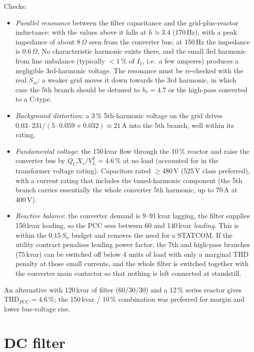 \documentclass[11pt,a4paper]{article}
\begin{document}
Checks:
\begin{itemize}
\item \emph{Parallel resonance} between the filter capacitance and the grid-plus-reactor inductance: with the values above it falls at $h \approx 3.4$ (170\,Hz), with a peak impedance of about 8\,$\Omega$ seen from the converter bus; at 150\,Hz the impedance is 0.6\,$\Omega$. No characteristic harmonic exists there, and the small 3rd harmonic from line unbalance (typically $< 1$\,\% of $I_1$, i.e.\ a few amperes) produces a negligible 3rd-harmonic voltage. The resonance must be re-checked with the real $S_{sc}$: a weaker grid moves it down towards the 3rd harmonic, in which case the 5th branch should be detuned to $h_t = 4.7$ or the high-pass converted to a C-type.
\item \emph{Background distortion}: a 3\,\% 5th-harmonic voltage on the grid drives $0.03\cdot231/(5\cdot0.059 + 0.032) \approx 21$\,A into the 5th branch, well within its rating.
\item \emph{Fundamental voltage}: the 150\,kvar flow through the 10\,\% reactor and raise the converter bus by $Q_C X_s/V_L^2 = 4.6$\,\% at no load (accounted for in the transformer voltage rating). Capacitors rated $\ge 480$\,V (525\,V class preferred), with a current rating that includes the tuned-harmonic component (the 5th branch carries essentially the whole converter 5th harmonic, up to 70\,A at 400\,V).
\item \emph{Reactive balance}: the converter demand is 9--91\,kvar lagging, the filter supplies 150\,kvar leading, so the PCC sees between 60 and 140\,kvar \emph{leading}. This is within the $0.15\,S_n$ budget and removes the need for a STATCOM. If the utility contract penalises leading power factor, the 7th and high-pass branches (75\,kvar) can be switched off below 4 units of load with only a marginal THD penalty at those small currents, and the whole filter is switched together with the converter main contactor so that nothing is left connected at standstill.
\end{itemize}

An alternative with 120\,kvar of filter (60/30/30) and a 12\,\% series reactor gives THD$_{PCC} = 4.6$\,\%; the 150\,kvar / 10\,\% combination was preferred for margin and lower bus-voltage rise.

\section{DC filter}
\label{sec:dcfilter}
\end{document}
